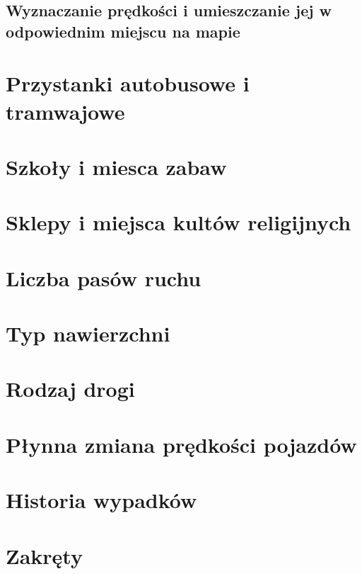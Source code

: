 \newpage
\subsection{Wyznaczanie prędkości i umieszczanie jej w odpowiednim miejscu na mapie}

\newpage
\section{Przystanki autobusowe i tramwajowe}
\label{sec:zakręty}

\newpage
\section{Szkoły i miesca zabaw}
\label{sec:zakręty}

\newpage
\section{Sklepy i miejsca kultów religijnych}
\label{sec:zakręty}

\newpage
\section{Liczba pasów ruchu}
\label{sec:zakręty}

\newpage
\section{Typ nawierzchni}
\label{sec:zakręty}

\newpage
\section{Rodzaj drogi}
\label{sec:zakręty}

\newpage
\section{Płynna zmiana prędkości pojazdów}
\label{sec:zakręty}

\newpage
\section{Historia wypadków}
\label{sec:zakręty}

\newpage
\section{Zakręty}
\label{sec:zakręty}

